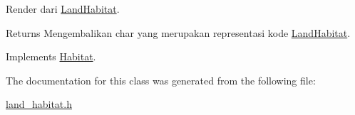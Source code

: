 Render dari \hyperlink{classLandHabitat}{Land\+Habitat}. 

\begin{DoxyReturn}{Returns}
Mengembalikan char yang merupakan representasi kode \hyperlink{classLandHabitat}{Land\+Habitat}. 
\end{DoxyReturn}


Implements \hyperlink{classHabitat_ad1bf10205d38e8e308eb9acc3aa2872c}{Habitat}.



The documentation for this class was generated from the following file\+:\begin{DoxyCompactItemize}
\item 
\hyperlink{land__habitat_8h}{land\+\_\+habitat.\+h}\end{DoxyCompactItemize}
